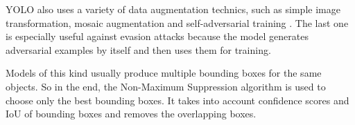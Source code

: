 \documentclass[14pt,a4paper]{extarticle}
\newcounter{e}
\numberwithin{equation}{section}
\numberwithin{figure}{section}
\begin{document}
YOLO also uses a variety of data augmentation technics, such as simple image transformation, mosaic augmentation and self-adversarial training \cite{yolov5-docks}. The last one is especially useful against evasion attacks because the model generates adversarial examples by itself and then uses them for training.

Models of this kind usually produce multiple bounding boxes for the same objects. So in the end, the Non-Maximum Suppression algorithm \cite{yolov1} is used to choose only the best bounding boxes. It takes into account confidence scores and IoU of bounding boxes and removes the overlapping boxes.

\end{document}
